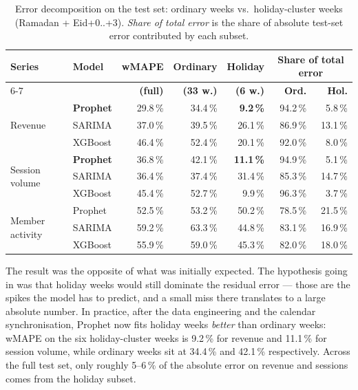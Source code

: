 \begin{table}[H]
  \centering
  \caption{Error decomposition on the test set: ordinary weeks vs.\ holiday-cluster
           weeks (Ramadan + Eid+0..+3). \emph{Share of total error} is the
           share of absolute test-set error contributed by each
           subset.\label{tab:error_decomposition}}
  \begin{tabular}{llrrrrr}
    \toprule
    \textbf{Series} & \textbf{Model} &
    \textbf{wMAPE} & \textbf{Ordinary} & \textbf{Holiday} &
    \multicolumn{2}{c}{\textbf{Share of total error}} \\
    \cmidrule(lr){6-7}
    & & \textbf{(full)} & \textbf{(33 w.)} & \textbf{(6 w.)} &
    \textbf{Ord.} & \textbf{Hol.} \\
    \midrule
    \multirow{3}{*}{Revenue}
      & \textbf{Prophet} & 29.8\,\% & 34.4\,\% & \textbf{9.2\,\%}  & 94.2\,\% & 5.8\,\% \\
      & SARIMA           & 37.0\,\% & 39.5\,\% & 26.1\,\% & 86.9\,\% & 13.1\,\% \\
      & XGBoost          & 46.4\,\% & 52.4\,\% & 20.1\,\% & 92.0\,\% & 8.0\,\% \\
    \midrule
    \multirow{3}{*}{Session volume}
      & \textbf{Prophet} & 36.8\,\% & 42.1\,\% & \textbf{11.1\,\%} & 94.9\,\% & 5.1\,\% \\
      & SARIMA           & 36.4\,\% & 37.4\,\% & 31.4\,\% & 85.3\,\% & 14.7\,\% \\
      & XGBoost          & 45.4\,\% & 52.7\,\% &  9.9\,\% & 96.3\,\% & 3.7\,\% \\
    \midrule
    \multirow{3}{*}{Member activity}
      & Prophet & 52.5\,\% & 53.2\,\% & 50.2\,\% & 78.5\,\% & 21.5\,\% \\
      & SARIMA  & 59.2\,\% & 63.3\,\% & 44.8\,\% & 83.1\,\% & 16.9\,\% \\
      & XGBoost & 55.9\,\% & 59.0\,\% & 45.3\,\% & 82.0\,\% & 18.0\,\% \\
    \bottomrule
  \end{tabular}
\end{table}

The result was the opposite of what was initially expected. The hypothesis
going in was that holiday weeks would still dominate the residual error ---
those are the spikes the model has to predict, and a small miss there
translates to a large absolute number. In practice, after the data
engineering and the calendar synchronisation, Prophet now fits holiday weeks
\emph{better} than ordinary weeks: wMAPE on the six holiday-cluster weeks is
9.2\,\% for revenue and 11.1\,\% for session volume, while ordinary weeks
sit at 34.4\,\% and 42.1\,\% respectively. Across the full test set, only
roughly 5--6\,\% of the absolute error on revenue and sessions comes from
the holiday subset.

